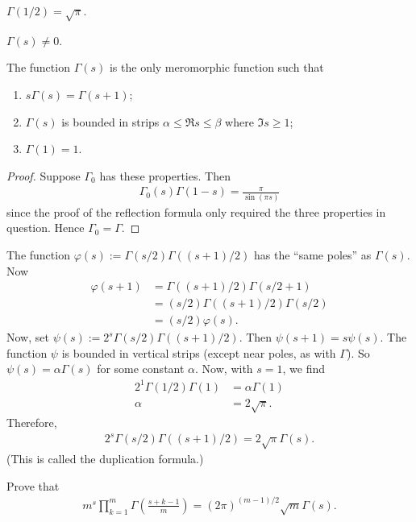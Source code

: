 \documentclass[11pt, oneside,margin=1in]{article}
\begin{document}
\begin{remark}
		$\Gamma(1/2) = \sqrt{\pi}$.
\end{remark}
\begin{remark}
		$\Gamma(s)\ne 0$.
\end{remark}
\begin{proposition}[ ]\label{}\text{}
The function $\Gamma(s)$ is the only meromorphic function such that
\begin{enumerate}
	\item $s\Gamma(s) = \Gamma (s+1)$;
	\item $\Gamma(s)$ is bounded in strips $\alpha\le \Re s \le \beta$ where $\Im s \ge 1$;
	\item $\Gamma(1)=1$.
\end{enumerate}
\end{proposition}
\begin{proof}
Suppose $\Gamma_0$ has these properties. Then 
\begin{align*}
	\Gamma_0(s)\Gamma (1-s) = \frac{\pi}{\sin  (\pi s)}
\end{align*}
since the proof of the reflection formula only required the three properties in question. Hence $\Gamma_0 = \Gamma$. 
\end{proof}

The function $\varphi(s) :=\Gamma(s/2)\Gamma ((s+1) /2)$ has the ``same poles'' as $\Gamma(s)$. Now
\begin{align*}
	\varphi(s+1)& = \Gamma((s+1)/2) \Gamma(s/2 + 1)\\
		    &= (s/2)\Gamma ((s+1)/2) \Gamma(s/2)\\
		    &=  (s/2)\varphi (s).
\end{align*}
Now, set $\psi(s):=2^s\Gamma(s/2)\Gamma ((s+1) /2) $. Then $\psi(s+1)=s\psi (s)$. The function $\psi$ is bounded in vertical strips (except near poles, as with $\Gamma$). So $\psi(s) = \alpha\Gamma (s)$ for some constant $\alpha$. Now, with $s=1$, we find
\begin{align*}
	2^1 \Gamma(1/2)\Gamma (1) &= \alpha \Gamma (1)\\
	\alpha &= 2\sqrt{\pi}.
\end{align*}
Therefore,
\begin{align*}
	2^s\Gamma(s/2)\Gamma((s+1) /2) = 2\sqrt \pi \Gamma(s).
\end{align*}
(This is called the duplication formula.)

 \begin{exercise}\label{extend it}\text{}
Prove that
\begin{align*}
	m^s \prod_{k=1}^m \Gamma \left(\frac{s+ k - 1}{m} \right) = (2\pi)^{ (m-1)/2} \sqrt m \Gamma (s).
\end{align*}
\end{exercise}
\end{document}
